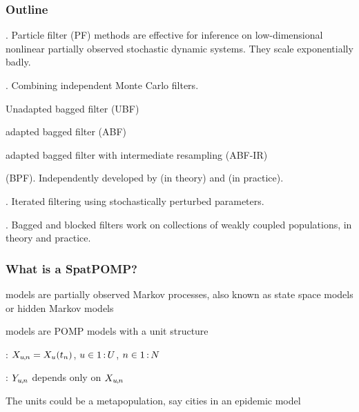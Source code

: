 \documentclass{beamer}
\begin{document}
\begin{frame}
  \frametitle{Outline}

  
  . Particle filter (PF) methods are effective for inference on low-dimensional nonlinear partially observed stochastic dynamic systems. They scale exponentially badly.

  \challengeSep
  
  . Combining independent Monte Carlo filters.

  \vspace{1mm}
  
  \begin{myitemize}
  \item Unadapted bagged filter (UBF)
  \item adapted bagged filter (ABF)
    \item adapted bagged filter with intermediate resampling (ABF-IR)
  \end{myitemize}

  \challengeSep

   (BPF). Independently developed by \citet{rebeschini15} (in theory) and \citet{ng02} (in practice).

  \challengeSep

  . Iterated filtering using stochastically perturbed parameters.

  \challengeSep

  . Bagged and blocked filters work on collections of weakly coupled populations, in theory and practice.

\end{frame}

\begin{frame}

  \frametitle{What is a SpatPOMP?}

   models are partially observed Markov processes, also known as state space models or hidden Markov models

  \vspace{6mm}
  
   models are POMP models with a unit structure

    \vspace{6mm}
 
  : $X_{u{\hspace{-0.25mm},\hspace{-0.2mm}}n}=X_{u}(t_n)$, \hspace{1mm} $u\in 1{{\hspace{0.6mm}:\hspace{0.6mm}}}U$, \hspace{1mm} $n\in 1{{\hspace{0.6mm}:\hspace{0.6mm}}}N$

    \vspace{6mm}
 
  : $Y_{u{\hspace{-0.25mm},\hspace{-0.2mm}}n}$ depends only on $X_{u{\hspace{-0.25mm},\hspace{-0.2mm}}n}$

    \vspace{6mm}
 
The units could be a metapopulation, say cities in an epidemic model

\end{frame}
\end{document}
